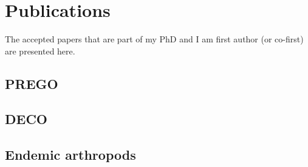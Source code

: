 \chapter{Publications}
\label{app:publications}

The accepted papers that are part of my PhD and I am first author (or co-first) are
presented here. 
\section{PREGO}


\section{DECO}

\section{Endemic arthropods}



